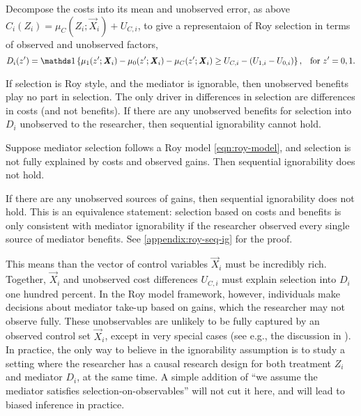 Decompose the costs into its mean and unobserved error, as above $C_i(Z_i) = \mu_{C}(Z_i; \vec X_i) + U_{C,i}$, to give a representaion of Roy selection in terms of observed and unobserved factors,
\[ D_i(z') = \indicator{
    \mu_1(z'; \vec X_i) - \mu_0(z'; \vec X_i) - \mu_C(z'; \vec X_i)
    \geq U_{C,i} - \left(U_{1,i} - U_{0,i}\right) }
        , \;\;\; \text{for } z'=0,1. \]

If selection is Roy style, and the mediator is ignorable, then unobserved benefits play no part in selection.
The only driver in differences in selection are differences in costs (and not benefits).
If there are any unobserved benefits for selection into $D_i$ unobserved to the researcher, then sequential ignorability cannot hold.
\begin{definition}
    \label{def:roy-seq-ig}
    Suppose mediator selection follows a Roy model \eqref{eqn:roy-model}, and selection is not fully explained by costs and observed gains.
    Then sequential ignorability does not hold.
\end{definition}
If there are any unobserved sources of gains, then sequential ignorability does not hold.
This is an equivalence statement: selection based on costs and benefits is only consistent with mediator ignorability if the researcher observed every single source of mediator benefits.
See \autoref{appendix:roy-seq-ig} for the proof.

This means than the vector of control variables $\vec X_i$ must be incredibly rich.
Together, $\vec X_i$ and unobserved cost differences $U_{C,i}$ must explain selection into $D_i$ one hundred percent.
In the Roy model framework, however, individuals make decisions about mediator take-up based on gains, which the researcher may not observe fully. 
These unobservables are unlikely to be fully captured by an observed control set $\vec X_i$, except in very special cases (see e.g., the discussion in \citealt{angrist2009mostly,angrist2022empirical}).
In practice, the only way to believe in the ignorability assumption is to study a setting where the researcher has a causal research design for both treatment $Z_i$ and mediator $D_i$, at the same time.
A simple addition of ``we assume the mediator satisfies selection-on-observables'' will not cut it here, and will lead to biased inference in practice.

% 
% 
% 
